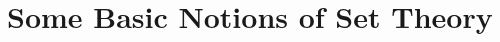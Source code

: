 \documentclass[class=mike-apostol-mathematical-analysis,crop=false]{standalone}
\begin{document}
\chapter{Some Basic Notions of Set Theory}
\end{document}
